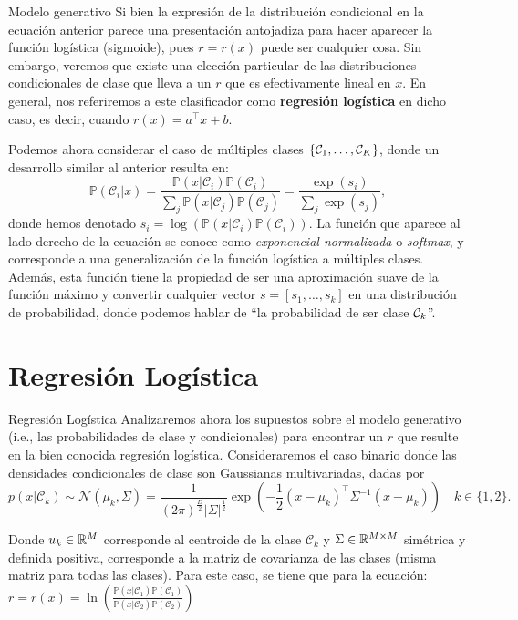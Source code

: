 \documentclass[9pt]{beamer}
\begin{document}
\begin{frame}{Modelo generativo}
Si bien la expresión de la distribución condicional en la ecuación anterior parece una presentación antojadiza para hacer aparecer la  función logística (sigmoide), pues $r=r(x)$ puede ser cualquier cosa. Sin embargo, veremos que existe una elección particular de las distribuciones condicionales de clase que lleva a un $r$ que es efectivamente lineal en $x$. En general, nos  referiremos a este clasificador como \textbf{regresión logística} en dicho caso, es decir, cuando $r(x) = a^\top x  + b$. \pause

Podemos ahora considerar el caso de múltiples clases $\{{\mathcal C}_1,\ldots,{\mathcal C}_K\}$, donde un desarrollo similar al anterior resulta en:  
\begin{equation*}
  \mathbb{P}(\mathcal{C}_i | x) = \frac{\mathbb{P}(x | \mathcal{C}_i)\mathbb{P}(\mathcal{C}_i)}{\sum_{j}\mathbb{P}(x | \mathcal{C}_j)\mathbb{P}(\mathcal{C}_j)} = \frac{\exp(s_i)}{\sum_{j}\exp(s_j)},\label{eq:softmax1}  
\end{equation*}
\pause
donde hemos denotado $s_i = \log\left(\mathbb{P}(x | \mathcal{C}_i)\mathbb{P}(\mathcal{C}_i)\right)$. La función que aparece al lado derecho de la ecuación se conoce como \emph{exponencial normalizada} o \emph{softmax}, y corresponde a una generalización de la función logística a múltiples clases. \\Además, esta función tiene la propiedad de ser una aproximación suave de la función máximo y convertir cualquier vector $s=[s_1,\ldots,s_k]$ en una distribución de probabilidad, donde podemos hablar de ``la probabilidad de ser clase ${\mathcal C}_k$''.


\end{frame}

\section{Regresión Logística}
\begin{frame}{Regresión Logística}
Analizaremos ahora  los supuestos sobre el modelo generativo (i.e., las  probabilidades de clase y condicionales) para encontrar un $r$ que resulte en la bien conocida regresión logística. \pause 
Consideraremos el caso binario donde las densidades condicionales de clase son Gaussianas multivariadas, dadas por 
\begin{equation*}
  p(x|\mathcal{C}_k) \sim \mathcal{N} (\mu_k,\Sigma) = \frac{1}{(2\pi)^\frac{D}{2}|\Sigma|^\frac{1}{2}}\exp(-\frac{1}{2}(x-\mu_k)^\top \Sigma^{-1}(x-\mu_k))\quad k\in\{1,2\}.
\end{equation*} \pause 

Donde $u_k\in\mathbb{R}^M$ corresponde al centroide de la clase $\mathcal{C}_k$ y $\Sigma\in\mathbb{R}^{M\times M}$ simétrica y definida positiva, corresponde a la matriz de covarianza de las clases (misma matriz para todas las clases). Para este caso, se tiene que para la ecuación: $r = r(x) =\ln\left(\frac{\mathbb{P}(x|\mathcal{C}_1)\mathbb{P}(\mathcal{C}_1)}{\mathbb{P}(x|\mathcal{C}_2)\mathbb{P}(\mathcal{C}_2)}\right)$ 


\end{frame}
\end{document}
